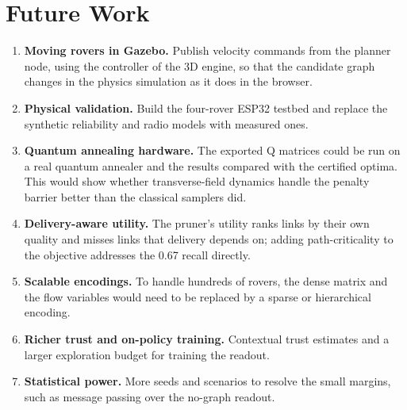 \section{Future Work}

\begin{enumerate}[label=\arabic*.]
\item \textbf{Moving rovers in Gazebo.} Publish velocity commands from the
planner node, using the controller of the 3D engine, so that the candidate
graph changes in the physics simulation as it does in the browser.
\item \textbf{Physical validation.} Build the four-rover ESP32 testbed and
replace the synthetic reliability and radio models with measured ones.
\item \textbf{Quantum annealing hardware.} The exported Q matrices could be
run on a real quantum annealer and the results compared with the certified
optima. This would show whether transverse-field dynamics handle the penalty
barrier better than the classical samplers did.
\item \textbf{Delivery-aware utility.} The pruner's utility ranks links by
their own quality and misses links that delivery depends on; adding
path-criticality to the objective addresses the 0.67 recall directly.
\item \textbf{Scalable encodings.} To handle hundreds of rovers, the dense
matrix and the flow variables would need to be replaced by a sparse or
hierarchical encoding.
\item \textbf{Richer trust and on-policy training.} Contextual trust
estimates and a larger exploration budget for training the readout.
\item \textbf{Statistical power.} More seeds and scenarios to resolve the
small margins, such as message passing over the no-graph readout.
\end{enumerate}
